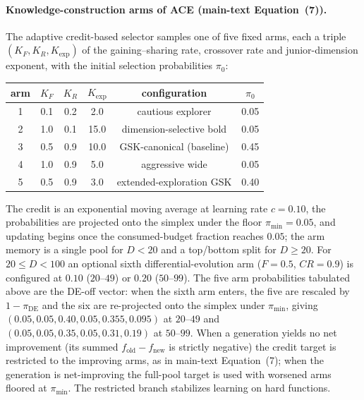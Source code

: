 \documentclass[algorithms,article,submit,moreauthors,pdftex]{Definitions/mdpi}
\begin{document}
\paragraph{Knowledge-construction arms of ACE (main-text Equation~(7)).}
The adaptive credit-based selector samples one of five fixed arms, each a triple
$(K_F, K_R, K_{\exp})$ of the gaining--sharing rate, crossover rate and
junior-dimension exponent, with the initial selection probabilities $\pi_0$:
\begin{center}
\small
\begin{tabular}{cccccc}
\toprule
arm & $K_F$ & $K_R$ & $K_{\exp}$ & configuration & $\pi_0$\\
\midrule
1 & 0.1 & 0.2 & 2.0  & cautious explorer            & 0.05\\
2 & 1.0 & 0.1 & 15.0 & dimension-selective bold     & 0.05\\
3 & 0.5 & 0.9 & 10.0 & GSK-canonical (baseline)     & 0.45\\
4 & 1.0 & 0.9 & 5.0  & aggressive wide              & 0.05\\
5 & 0.5 & 0.9 & 3.0  & extended-exploration GSK     & 0.40\\
\bottomrule
\end{tabular}
\end{center}
The credit is an exponential moving average at learning rate $c=0.10$, the
probabilities are projected onto the simplex under the floor $\pi_{\min}=0.05$,
and updating begins once the consumed-budget fraction reaches $0.05$; the arm
memory is a single pool for $D<20$ and a top/bottom split for $D\ge 20$.  For
$20\le D<100$ an optional sixth differential-evolution arm ($F=0.5$, $CR=0.9$)
is configured at $0.10$ ($20$--$49$) or $0.20$ ($50$--$99$).  The five arm
probabilities tabulated above are the DE-off vector: when the sixth arm enters,
the five are rescaled by $1-\pi_{\mathrm{DE}}$ and the six are re-projected onto
the simplex under $\pi_{\min}$, giving $(0.05,0.05,0.40,0.05,0.355,0.095)$ at
$20$--$49$ and $(0.05,0.05,0.35,0.05,0.31,0.19)$ at $50$--$99$.  When a generation yields no net
improvement (its summed $f_{\mathrm{old}}-f_{\mathrm{new}}$ is strictly negative) the
credit target is restricted to the improving arms, as in main-text
Equation~(7); when the generation is net-improving the full-pool target is
used with worsened arms floored at $\pi_{\min}$.  The restricted branch
stabilizes learning on hard functions.
\end{document}
